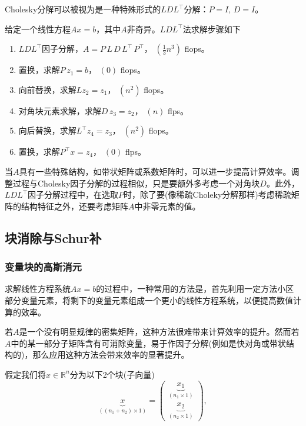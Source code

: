 \begin{subappendices}
Cholesky分解可以被视为是一种特殊形式的$LDL^{\top}$分解：$P=I, \, D = I$。

\begin{algorithm}
  \label{algorithm:numlin-factorization-ldl}
  给定一个线性方程$A x = b$，其中$A$非奇异。$LDL^{\top}$法求解步骤如下
  \begin{enumerate}
    \item $LDL^{\top}$因子分解，$A = P \, L \, D \, L^{\top} \, P^{\top}$， $\left( \frac{1}{3} n^{3} \right)$ flops。
    \item 置换，求解$P \, z_{1} = b$， $\left( 0 \right)$ flops。
    \item 向前替换，求解$L z_{2} = z_{1}$， $\left( n^{2} \right)$ flops。
    \item 对角块元素求解，求解$D \, z_{3} = z_{2}$， $\left( n \right)$ flps。
    \item 向后替换，求解$L^{\top} z_{4} = z_{3}$， $\left( n^{2} \right)$ flops。
    \item 置换，求解$P^{\top} x = z_{4}$， $\left( 0 \right)$ flps。
  \end{enumerate}
\end{algorithm}

当$A$具有一些特殊结构，如带状矩阵或系数矩阵时，可以进一步提高计算效率。调整过程与Cholesky因子分解的过程相似，只是要额外多考虑一个对角块$D$。此外，$LDL^{\top}$因子分解过程中，在选取$P$时，除了要(像稀疏Choleky分解那样)考虑稀疏矩阵的结构特征之外，还要考虑矩阵$A$中非零元素的值。

\subsection{块消除与Schur补}
\label{sec:numlin-block-elimination}

\subsubsection{变量块的高斯消元}
\label{sec:numlin-gaussian-elimination}
求解线性方程系统$A x = b$的过程中，一种常用的方法是，首先利用一定方法小区部分变量元素，将剩下的变量元素组成一个更小的线性方程系统，以便提高数值计算的效率。

若$A$是一个没有明显规律的密集矩阵，这种方法很难带来计算效率的提升。然而若$A$中的某一部分子矩阵含有可消除变量，易于作因子分解(例如是快对角或带状结构的)，那么应用这种方法会带来效率的显著提升。

假定我们将$x \in \mathbb{R}^{n}$分为以下2个块(子向量)
\begin{equation*}
  \underbrace{x}_{\left( \left( n_{1} + n_{2} \right) \times 1 \right)} =
  \begin{pmatrix}
  \underbrace{x_{1}}_{\left( n_{1} \times 1 \right)} \\
  \underbrace{x_{2}}_{\left( n_{2} \times 1 \right)}
  \end{pmatrix},
\end{equation*}


\end{subappendices}
